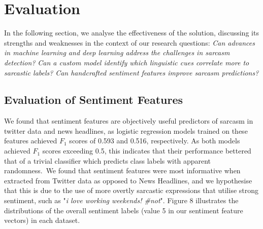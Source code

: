 \documentclass[12pt,a4paper]{article}
\begin{document}
\section{Evaluation}
\noindent In the following section, we analyse the effectiveness of the solution, discussing its strengths and weaknesses in the context of our research questions: \textit{Can advances in machine learning and deep learning address the challenges in sarcasm detection?} \textit{Can a custom model identify which linguistic cues correlate more to sarcastic labels?} \textit{Can handcrafted sentiment features improve sarcasm predictions?}\\\vspace{-10pt}


\subsection{Evaluation of Sentiment Features}\vspace{-10pt}
\noindent We found that sentiment features are objectively useful predictors of sarcasm in twitter data and news headlines, as logistic regression models trained on these features achieved $F_1$ scores of 0.593 and 0.516, respectively. As both models achieved $F_1$ scores exceeding 0.5, this indicates that their performance bettered that of a trivial classifier which predicts class labels with apparent randomness.\ We found that sentiment features were most informative when extracted from Twitter data as opposed to News Headlines, and we hypothesise that this is due to the use of more overtly sarcastic expressions that utilise strong sentiment, such as "\textit{i love working weekends! \#not}". Figure 8 illustrates the distributions of the overall sentiment labels (value 5 in our sentiment feature vectors) in each dataset.\\
\end{document}
